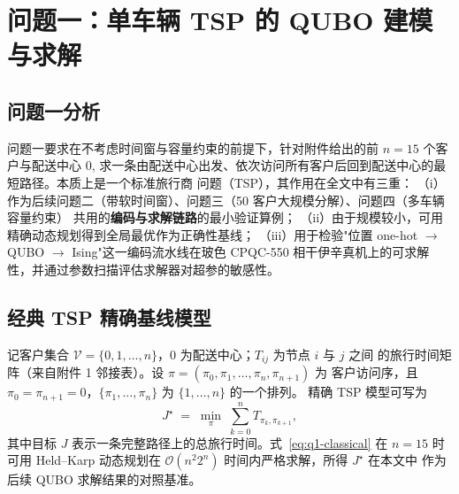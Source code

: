 \documentclass[UTF8,12pt,a4paper]{ctexart}
\begin{document}
\setcounter{section}{5}

\section{问题一：单车辆 TSP 的 QUBO 建模与求解}
\label{sec:q1}

\subsection{问题一分析}

问题一要求在不考虑时间窗与容量约束的前提下，针对附件给出的前 $n=15$ 个客户与配送中心 0,
求一条由配送中心出发、依次访问所有客户后回到配送中心的最短路径。本质上是一个标准旅行商
问题（TSP），其作用在全文中有三重：
（i）作为后续问题二（带软时间窗）、问题三（50 客户大规模分解）、问题四（多车辆容量约束）
共用的\textbf{编码与求解链路}的最小验证算例；
（ii）由于规模较小，可用精确动态规划得到全局最优作为正确性基线；
（iii）用于检验"位置 one-hot $\to$ QUBO $\to$ Ising"这一编码流水线在玻色 CPQC-550
相干伊辛真机上的可求解性，并通过参数扫描评估求解器对超参的敏感性。

\subsection{经典 TSP 精确基线模型}

记客户集合 $\mathcal{V}=\{0,1,\dots,n\}$，0 为配送中心；$T_{ij}$ 为节点 $i$ 与 $j$ 之间
的旅行时间矩阵（来自附件 1 邻接表）。设 $\pi=(\pi_0,\pi_1,\dots,\pi_n,\pi_{n+1})$ 为
客户访问序，且 $\pi_0=\pi_{n+1}=0$，$\{\pi_1,\dots,\pi_n\}$ 为 $\{1,\dots,n\}$ 的一个排列。
精确 TSP 模型可写为
\begin{equation}
\label{eq:q1-classical}
J^{\star} \;=\; \min_{\pi}\; \sum_{k=0}^{n} T_{\pi_k,\pi_{k+1}},
\end{equation}
其中目标 $J$ 表示一条完整路径上的总旅行时间。式~\eqref{eq:q1-classical} 在 $n=15$ 时可用
Held--Karp 动态规划在 $\mathcal{O}(n^2 2^n)$ 时间内严格求解，所得 $J^{\star}$ 在本文中
作为后续 QUBO 求解结果的对照基准。

\end{document}
